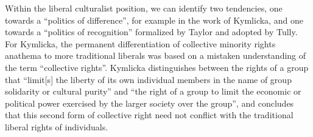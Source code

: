 \documentclass[12pt,oneside]{memoir}
\begin{document}
Within the liberal culturalist position, we can identify two tendencies, one towards a ``politics of difference'', for example in the work of Kymlicka, and one towards a ``politics of recognition'' formalized by Taylor and adopted by Tully. For Kymlicka, the permanent differentiation of collective minority rights anathema to more traditional liberals was based on a mistaken understanding of the term ``collective rights''. Kymlicka distinguishes between the rights of a group that ``limit[s] the liberty of its own individual members in the name of group solidarity or cultural purity'' and ``the right of a group to limit the economic or political power exercised by the larger society over the group'', and concludes that this second form of collective right need not conflict with the traditional liberal rights of individuals.


\backmatter

 

\end{document}
